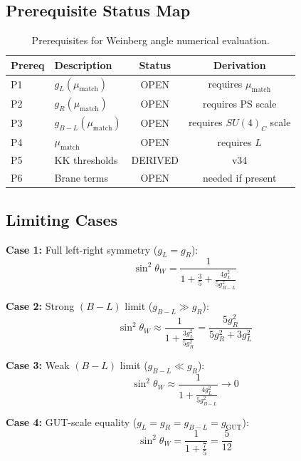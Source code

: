 \documentclass[11pt,a4paper]{article}
\begin{document}
\subsection{Prerequisite Status Map}
\label{subsec:prereq-status}

\begin{table}[ht]
\centering
\caption{Prerequisites for Weinberg angle numerical evaluation.}
\label{tab:weinberg-prereqs}
\begin{tabular}{llcc}
\toprule
Prereq & Description & Status & Derivation \\
\midrule
P1 & $g_L(\mu_{\text{match}})$ & OPEN & requires $\mu_{\text{match}}$ \\
P2 & $g_R(\mu_{\text{match}})$ & OPEN & requires PS scale \\
P3 & $g_{B-L}(\mu_{\text{match}})$ & OPEN & requires $SU(4)_C$ scale \\
P4 & $\mu_{\text{match}}$ & OPEN & requires $L$ \\
P5 & KK thresholds & DERIVED & v34 \\
P6 & Brane terms & OPEN & needed if present \\
\bottomrule
\end{tabular}
\end{table}

\subsection{Limiting Cases}
\label{subsec:limiting-cases}

\textbf{Case 1:} Full left-right symmetry ($g_L = g_R$):
\begin{equation}
\label{eq:case1-weinberg}
\sin^2\theta_W = \frac{1}{1 + \frac{3}{5} + \frac{4 g_L^2}{5 g_{B-L}^2}}
\end{equation}

\textbf{Case 2:} Strong $(B-L)$ limit ($g_{B-L} \gg g_R$):
\begin{equation}
\label{eq:case2-weinberg}
\sin^2\theta_W \approx \frac{1}{1 + \frac{3 g_L^2}{5 g_R^2}} = \frac{5 g_R^2}{5 g_R^2 + 3 g_L^2}
\end{equation}

\textbf{Case 3:} Weak $(B-L)$ limit ($g_{B-L} \ll g_R$):
\begin{equation}
\label{eq:case3-weinberg}
\sin^2\theta_W \approx \frac{1}{1 + \frac{4 g_L^2}{5 g_{B-L}^2}} \to 0
\end{equation}

\textbf{Case 4:} GUT-scale equality ($g_L = g_R = g_{B-L} = g_{\text{GUT}}$):
\begin{equation}
\label{eq:case4-weinberg}
\sin^2\theta_W = \frac{1}{1 + \frac{7}{5}} = \frac{5}{12}
\end{equation}
\end{document}
